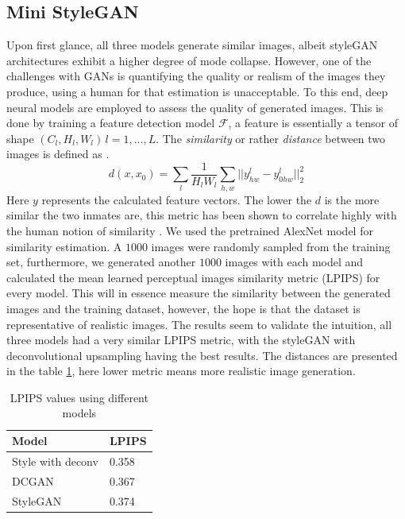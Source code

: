 \documentclass[conference]{IEEEtran}
\begin{document}
\subsection{Mini StyleGAN}
Upon first glance, all three models generate similar images, albeit styleGAN architectures exhibit a higher degree of mode collapse. However, one of the challenges with GANs is quantifying the quality or realism of the images they produce, using a human for that estimation is unacceptable.
To this end, deep neural models are employed to assess the quality of generated images. This is done by training a feature detection model $\mathcal{F}$, a feature is essentially a tensor of shape $(C_l,H_l,W_l) \, l = 1,...,L$. The \textit{similarity} or rather \textit{distance} between two images is defined as \cite{PERCSIM}.
\begin{equation}
d(x,x_0) = \sum_l \frac{1}{H_l W_l} \sum_{h,w}|| y_{hw}^l - y_{0hw}^l ||^2_2
\end{equation}
Here $y$ represents the calculated feature vectors. The lower the $d$ is the more similar the two inmates are, this metric has been shown to correlate highly with the human notion of similarity \cite{PERCSIM}.
We used the pretrained AlexNet model for similarity estimation. A $1000$ images were randomly sampled from the training set, furthermore, we generated another $1000$ images with each model and calculated the mean learned perceptual images similarity metric (LPIPS) for every model. This will in essence measure the similarity between the generated images and the training dataset, however, the hope is that the dataset is representative of realistic images. The results seem to validate the intuition, all three models had a very similar LPIPS metric, with the styleGAN with deconvolutional upsampling having the best results. The distances are presented in the table \ref{tab:results}, here lower metric means more realistic image generation.


\begin{table}[!h]
	\begin{center}
		\caption{LPIPS values using different models}
		\begin{tabular}{ll}
			\toprule
			Model & LPIPS \\
			\midrule
			Style with deconv & 0.358\\
			DCGAN & 0.367 \\
			StyleGAN & 0.374 \\
			\bottomrule
		\end{tabular}
		\label{tab:results}
	\end{center}
\end{table}
%
\end{document}
